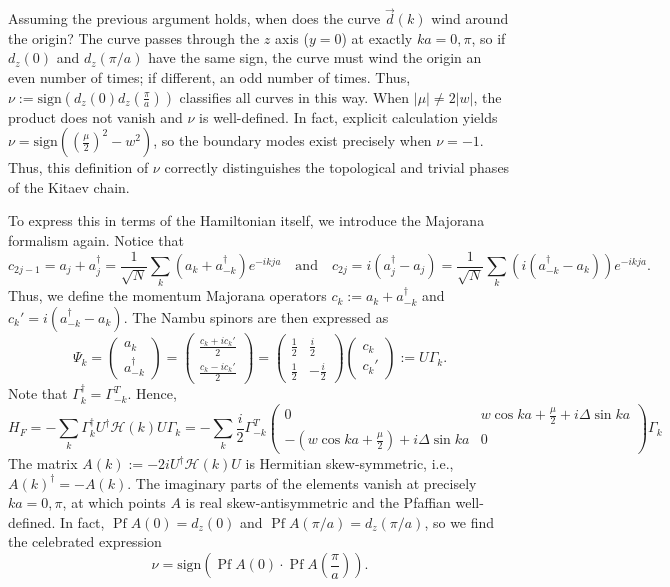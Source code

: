 \documentclass{article}
\DeclareMathOperator{\pfaff}{Pf}
\begin{document}
Assuming the previous argument holds, when does the curve $\vec{d}(k)$ wind around the origin?
The curve passes through the $z$ axis ($y=0$) at exactly $ka = 0, \pi$,
so if $d_z(0)$ and $d_z(\pi/a)$ have the same sign, the curve must wind the origin an even number of times;
if different, an odd number of times.
Thus, $\nu := \mathrm{sign}\left(d_z(0) d_z\left(\frac{\pi}{a}\right)\right)$ classifies all curves in this way.
When $|\mu| \neq 2|w|$, the product does not vanish and $\nu$ is well-defined.
In fact, explicit calculation yields $\nu = \mathrm{sign}\left(\left(\frac{\mu}{2}\right)^2 - w^2\right)$,
so the boundary modes exist precisely when $\nu = -1$.
Thus, this definition of $\nu$ correctly distinguishes the topological and trivial phases of the Kitaev chain.

To express this in terms of the Hamiltonian itself, we introduce the Majorana formalism again.
Notice that
\[
    c_{2j-1} = a_j + a_j^\dagger = \frac{1}{\sqrt{N}}\sum_k \left(a_k+a_{-k}^\dagger\right)e^{-ikja}\quad
    \text{and}\quad
    c_{2j} = i\left(a_j^\dagger - a_j\right) = \frac{1}{\sqrt{N}}\sum_k \left(
        i\left(a_{-k}^\dagger - a_k\right)
    \right) e^{-ikja}.
\]
Thus, we define the momentum Majorana operators
$c_k := a_k + a_{-k}^\dagger$ and $c_k' = i\left(a_{-k}^\dagger - a_k\right)$.
The Nambu spinors are then expressed as
\[
    \Psi_k = \begin{pmatrix}
        a_k \\ a_{-k}^\dagger
    \end{pmatrix} = \begin{pmatrix}
        \frac{c_k + ic_k'}{2} \\ \frac{c_k - ic_k'}{2}
    \end{pmatrix} = \begin{pmatrix}
        \frac{1}{2} & \frac{i}{2} \\ \frac{1}{2} & -\frac{i}{2}
    \end{pmatrix} \begin{pmatrix}
        c_k \\ c_k'
    \end{pmatrix} := U\Gamma_k.
\]
Note that $\Gamma_k^\dagger = \Gamma_{-k}^T$. Hence,
\[
    H_F = -\sum_k \Gamma_k^\dagger U^\dagger \mathcal{H}(k) U\Gamma_k
    = -\sum_k \frac{i}{2} \Gamma_{-k}^T \begin{pmatrix}
        0 & w\cos ka + \frac{\mu}{2} +i\Delta\sin ka \\
        -\left(w\cos ka + \frac{\mu}{2}\right) + i\Delta\sin ka & 0
    \end{pmatrix} \Gamma_k
\]
The matrix $A(k) := -2iU^\dagger \mathcal{H}(k) U$ is Hermitian skew-symmetric,
i.e., $A(k)^\dagger = -A(k)$.
The imaginary parts of the elements vanish at precisely $ka=0, \pi$,
at which points $A$ is real skew-antisymmetric and the Pfaffian well-defined.
In fact, $\pfaff A(0) = d_z(0)$ and $\pfaff A(\pi/a) = d_z(\pi/a)$, so we find the celebrated expression
\[
    \nu = \mathrm{sign}\left(\pfaff A(0) \cdot \pfaff A\left(\frac{\pi}{a}\right)\right).
\]
\end{document}
